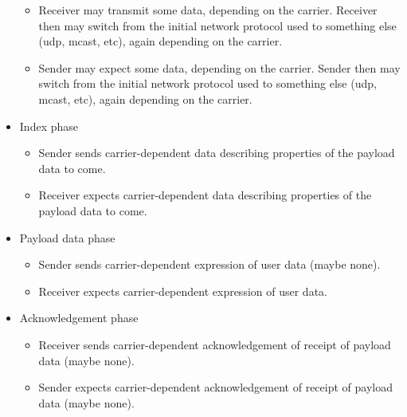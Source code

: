 \begin{itemize}
\begin{itemize}
  \item Receiver may transmit some data, depending on the carrier.
    Receiver then may switch from the initial network
    protocol used to something else (udp, mcast, etc), again
    depending on the carrier.
    
  \item Sender may expect some data, depending on the carrier.
    Sender then may switch from the initial network
    protocol used to something else (udp, mcast, etc), again
    depending on the carrier.

  \end{itemize}

\item Index phase
    
  \begin{itemize}
    
  \item Sender sends carrier-dependent data describing properties of
    the payload data to come.
    
  \item Receiver expects carrier-dependent data describing properties
    of the payload data to come.
    
  \end{itemize}
  
\item Payload data phase
  
  \begin{itemize}
    
  \item Sender sends carrier-dependent expression of user data (maybe none).
    
  \item Receiver expects carrier-dependent expression of user data.
    
  \end{itemize}

\item Acknowledgement phase

  \begin{itemize}
    
  \item Receiver sends carrier-dependent acknowledgement of receipt of
    payload data (maybe none).
    
  \item Sender expects carrier-dependent acknowledgement of receipt of
    payload data (maybe none).
    
  \end{itemize}
  
\end{itemize}


